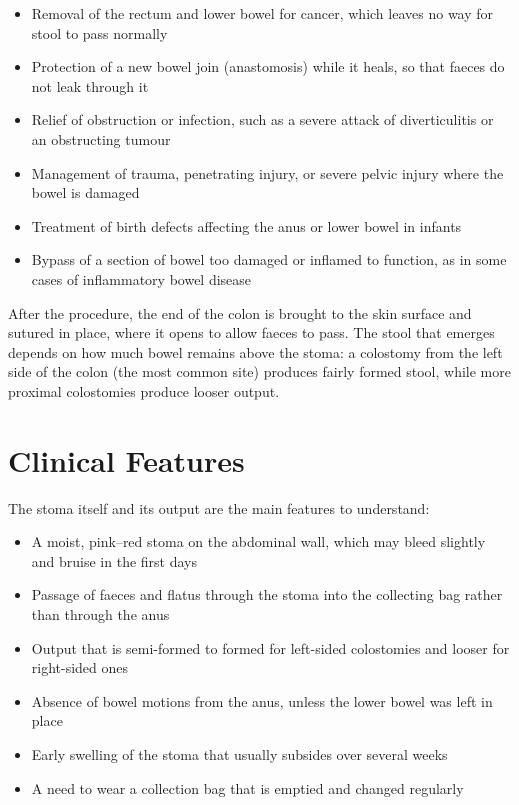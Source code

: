 \begin{itemize}
    \item Removal of the rectum and lower bowel for cancer, which leaves no way for stool to pass normally
    \item Protection of a new bowel join (anastomosis) while it heals, so that faeces do not leak through it
    \item Relief of obstruction or infection, such as a severe attack of diverticulitis or an obstructing tumour
    \item Management of trauma, penetrating injury, or severe pelvic injury where the bowel is damaged
    \item Treatment of birth defects affecting the anus or lower bowel in infants
    \item Bypass of a section of bowel too damaged or inflamed to function, as in some cases of inflammatory bowel disease
\end{itemize}

After the procedure, the end of the colon is brought to the skin surface and sutured in place, where it opens to allow faeces to pass. The stool that emerges depends on how much bowel remains above the stoma: a colostomy from the left side of the colon (the most common site) produces fairly formed stool, while more proximal colostomies produce looser output.

\section*{Clinical Features}
The stoma itself and its output are the main features to understand:

\begin{itemize}
    \item A moist, pink--red stoma on the abdominal wall, which may bleed slightly and bruise in the first days
    \item Passage of faeces and flatus through the stoma into the collecting bag rather than through the anus
    \item Output that is semi-formed to formed for left-sided colostomies and looser for right-sided ones
    \item Absence of bowel motions from the anus, unless the lower bowel was left in place
    \item Early swelling of the stoma that usually subsides over several weeks
    \item A need to wear a collection bag that is emptied and changed regularly
\end{itemize}


